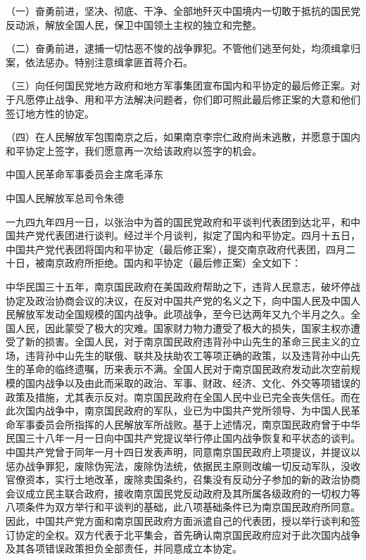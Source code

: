 （一）奋勇前进，坚决、彻底、干净、全部地歼灭中国境内一切敢于抵抗的国民党反动派，解放全国人民，保卫中国领土主权的独立和完整。

（二）奋勇前进，逮捕一切怙恶不悛的战争罪犯。不管他们逃至何处，均须缉拿归案，依法惩办。特别注意缉拿匪首蒋介石。

（三）向任何国民党地方政府和地方军事集团宣布国内和平协定的最后修正案。对于凡愿停止战争、用和平方法解决问题者，你们即可照此最后修正案的大意和他们签订地方性的协定。

（四）在人民解放军包围南京之后，如果南京李宗仁政府尚未逃散，并愿意于国内和平协定上签字，我们愿意再一次给该政府以签字的机会。

中国人民革命军事委员会主席毛泽东

中国人民解放军总司令朱德


\begin{maonote}
一九四九年四月一日，以张治中为首的国民党政府和平谈判代表团到达北平，和中国共产党代表团进行谈判。经过半个月谈判，拟定了国内和平协定。四月十五日，中国共产党代表团将国内和平协定（最后修正案），提交南京政府代表团，四月二十日，被南京政府所拒绝。国内和平协定（最后修正案）全文如下：

中华民国三十五年，南京国民政府在美国政府帮助之下，违背人民意志，破坏停战协定及政治协商会议的决议，在反对中国共产党的名义之下，向中国人民及中国人民解放军发动全国规模的国内战争。此项战争，至今已达两年又九个半月之久。全国人民，因此蒙受了极大的灾难。国家财力物力遭受了极大的损失，国家主权亦遭受了新的损害。全国人民，对于南京国民政府违背孙中山先生的革命三民主义的立场，违背孙中山先生的联俄、联共及扶助农工等项正确的政策，以及违背孙中山先生的革命的临终遗嘱，历来表示不满。全国人民对于南京国民政府发动此次空前规模的国内战争以及由此而采取的政治、军事、财政、经济、文化、外交等项错误的政策及措施，尤其表示反对。南京国民政府在全国人民中业已完全丧失信任。而在此次国内战争中，南京国民政府的军队，业已为中国共产党所领导、为中国人民革命军事委员会所指挥的人民解放军所战败。基于上述情况，南京国民政府曾于中华民国三十八年一月一日向中国共产党提议举行停止国内战争恢复和平状态的谈判。中国共产党曾于同年一月十四日发表声明，同意南京国民政府上项提议，并提议以惩办战争罪犯，废除伪宪法，废除伪法统，依据民主原则改编一切反动军队，没收官僚资本，实行土地改革，废除卖国条约，召集没有反动分子参加的新的政治协商会议成立民主联合政府，接收南京国民党反动政府及其所属各级政府的一切权力等八项条件为双方举行和平谈判的基础，此八项基础条件已为南京国民政府所同意。因此，中国共产党方面和南京国民政府方面派遣自己的代表团，授以举行谈判和签订协定的全权。双方代表于北平集会，首先确认南京国民政府应对于此次国内战争及其各项错误政策担负全部责任，并同意成立本协定。


\end{maonote}
